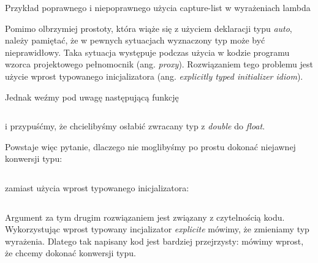 \documentclass{pracamgr}
\begin{document}
\begin{listing}[H]
\inputminted[mathescape, linenos, numbersep=5pt, bgcolor=bg, rulecolor=\color{darkgray}, frame=lines, framesep=2mm]{cpp}{listings/auto.cpp}
\caption{Przykład poprawnego i niepoprawnego użycia capture-list w wyrażeniach lambda}
\label{lst:auto}
\end{listing}

Pomimo olbrzymiej prostoty, która wiąże się z użyciem deklaracji typu \textit{auto}, 
należy pamiętać, że w pewnych sytuacjach
wyznaczony typ może być nieprawidłowy. Taka sytuacja występuje podczas użycia w kodzie programu wzorca 
projektowego pełnomocnik (ang. \textit{proxy}).
Rozwiązaniem tego problemu jest użycie wprost typowanego inicjalizatora (ang. \textit{explicitly typed initializer idiom}).

Jednak weźmy pod uwagę następującą funkcję

\begin{listing}[H]
\inputminted[mathescape,  numbersep=5pt, bgcolor=bg, rulecolor=\color{darkgray}, frame=lines, framesep=2mm]{cpp}{listings/auto/auto1.cpp}  
\end{listing}

i przypuśćmy, że chcielibyśmy osłabić zwracany typ z \textit{double} do \textit{float}.

Powstaje więc pytanie, dlaczego nie moglibyśmy po prostu dokonać niejawnej konwersji typu:

\begin{listing}[H]
\inputminted[numbersep=5pt, bgcolor=bg, rulecolor=\color{darkgray}, frame=lines, framesep=2mm]{cpp}{listings/auto/auto2.cpp}  
\end{listing}

zamiast użycia wprost typowanego inicjalizatora:


\begin{listing}[H]
\inputminted[numbersep=5pt, bgcolor=bg, rulecolor=\color{darkgray}, frame=lines, framesep=2mm]{cpp}{listings/auto/auto3.cpp}  
\end{listing}

Argument za tym drugim rozwiązaniem jest związany z czytelnością kodu. Wykorzystując wprost typowany incjalizator 
\textit{explicite} mówimy, że zmieniamy typ wyrażenia. Dlatego tak napisany kod jest bardziej przejrzysty: mówimy 
wprost, że chcemy dokonać konwersji typu.
\end{document}
